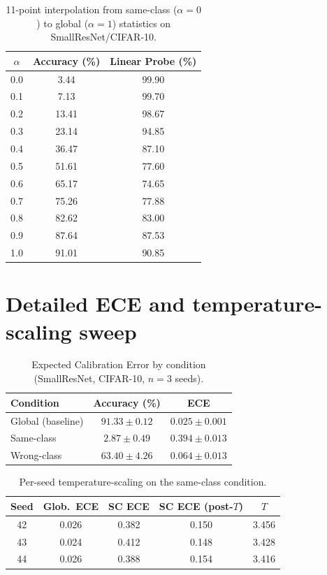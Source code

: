\documentclass{article}
\begin{document}
\begin{table}[h]
\caption{11-point interpolation from same-class ($\alpha=0$) to global ($\alpha=1$) statistics on SmallResNet/CIFAR-10.}
\label{tab:interp_full}
\centering
\small
\begin{tabular}{@{}ccc@{}}
\toprule
$\alpha$ & Accuracy (\%) & Linear Probe (\%) \\
\midrule
0.0 & 3.44  & 99.90 \\
0.1 & 7.13  & 99.70 \\
0.2 & 13.41 & 98.67 \\
0.3 & 23.14 & 94.85 \\
0.4 & 36.47 & 87.10 \\
0.5 & 51.61 & 77.60 \\
0.6 & 65.17 & 74.65 \\
0.7 & 75.26 & 77.88 \\
0.8 & 82.62 & 83.00 \\
0.9 & 87.64 & 87.53 \\
1.0 & 91.01 & 90.85 \\
\bottomrule
\end{tabular}
\end{table}

\section{Detailed ECE and temperature-scaling sweep}
\label{app:ece}

\begin{table}[h]
\caption{Expected Calibration Error by condition (SmallResNet, CIFAR-10, $n{=}3$ seeds).}
\label{tab:ece_full}
\centering
\small
\begin{tabular}{@{}lcc@{}}
\toprule
Condition & Accuracy (\%) & ECE \\
\midrule
Global (baseline) & $91.33 \pm 0.12$ & $0.025 \pm 0.001$ \\
Same-class        & $2.87 \pm 0.49$  & $0.394 \pm 0.013$ \\
Wrong-class       & $63.40 \pm 4.26$ & $0.064 \pm 0.013$ \\
\bottomrule
\end{tabular}
\end{table}

\begin{table}[h]
\caption{Per-seed temperature-scaling on the same-class condition.}
\label{tab:tempscale_full}
\centering
\small
\begin{tabular}{@{}ccccc@{}}
\toprule
Seed & Glob.\ ECE & SC ECE & SC ECE (post-$T$) & $T$ \\
\midrule
42 & 0.026 & 0.382 & 0.150 & 3.456 \\
43 & 0.024 & 0.412 & 0.148 & 3.428 \\
44 & 0.026 & 0.388 & 0.154 & 3.416 \\
\bottomrule
\end{tabular}
\end{table}
\end{document}
